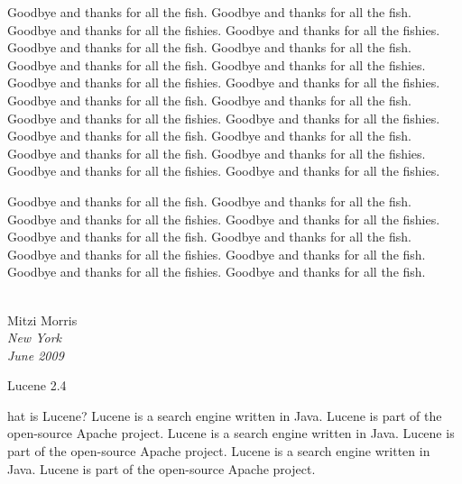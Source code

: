 \documentclass[11pt]{book}
\begin{document}
Goodbye and thanks for all the fish.
Goodbye and thanks for all the fish.
Goodbye and thanks for all the fishies.
Goodbye and thanks for all the fishies.
Goodbye and thanks for all the fish.
Goodbye and thanks for all the fish.
Goodbye and thanks for all the fish.
Goodbye and thanks for all the fishies.
Goodbye and thanks for all the fishies.
Goodbye and thanks for all the fishies.
Goodbye and thanks for all the fish.
Goodbye and thanks for all the fish.
Goodbye and thanks for all the fishies.
Goodbye and thanks for all the fishies.
Goodbye and thanks for all the fish.
Goodbye and thanks for all the fish.
Goodbye and thanks for all the fish.
Goodbye and thanks for all the fishies.
Goodbye and thanks for all the fishies.
Goodbye and thanks for all the fishies.

Goodbye and thanks for all the fish.
Goodbye and thanks for all the fish.
Goodbye and thanks for all the fishies.
Goodbye and thanks for all the fishies.
Goodbye and thanks for all the fish.
Goodbye and thanks for all the fish.
Goodbye and thanks for all the fishies.
Goodbye and thanks for all the fish.
Goodbye and thanks for all the fishies.
Goodbye and thanks for all the fish.
\\[0.2in]
\newlength{\sigWidth}
\mbox{ }
\hfill
\parbox{\sigWidth}{
Mitzi Morris
\\[2pt]\small
\it New York
\\
June 2009}



\clearpage
\pagestyle{empty}
\cleardoublepage
\vspace*{2.375in}
\begin{center}
{\hfill {\Huge Lucene 2.4}}
\end{center}




%
\setcounter{page}{1}%
%
\pagestyle{fancy}%

hat is Lucene?
Lucene is a search engine written in Java.  Lucene is part of the
open-source Apache project.
Lucene is a search engine written in Java.  Lucene is part of the
open-source Apache project.
Lucene is a search engine written in Java.  Lucene is part of the
open-source Apache project.

\end{document}
